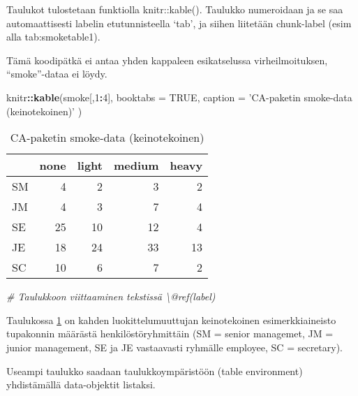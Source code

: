 \documentclass[finnish,]{book}
\newenvironment{Shaded}{\begin{snugshade}}{\end{snugshade}}
\newcommand{\CommentTok}[1]{\textcolor[rgb]{0.56,0.35,0.01}{\textit{#1}}}
\newcommand{\DataTypeTok}[1]{\textcolor[rgb]{0.13,0.29,0.53}{#1}}
\newcommand{\DecValTok}[1]{\textcolor[rgb]{0.00,0.00,0.81}{#1}}
\newcommand{\KeywordTok}[1]{\textcolor[rgb]{0.13,0.29,0.53}{\textbf{#1}}}
\newcommand{\NormalTok}[1]{#1}
\newcommand{\OperatorTok}[1]{\textcolor[rgb]{0.81,0.36,0.00}{\textbf{#1}}}
\newcommand{\OtherTok}[1]{\textcolor[rgb]{0.56,0.35,0.01}{#1}}
\newcommand{\StringTok}[1]{\textcolor[rgb]{0.31,0.60,0.02}{#1}}
\theoremstyle{definition}
\theoremstyle{definition}
\theoremstyle{definition}
\theoremstyle{remark}
\begin{document}
Taulukot tulostetaan funktiolla knitr::kable(). Taulukko numeroidaan ja
se saa automaattisesti labelin etutunnisteella `tab', ja siihen
liitetään chunk-label (esim alla tab:smoketable1).

Tämä koodipätkä ei antaa yhden kappaleen esikatselussa virheilmoituksen,
``smoke''-dataa ei löydy.

\begin{Shaded}
\begin{Highlighting}[]
\NormalTok{knitr}\OperatorTok{::}\KeywordTok{kable}\NormalTok{(smoke[,}\DecValTok{1}\OperatorTok{:}\DecValTok{4}\NormalTok{], }\DataTypeTok{booktabs =} \OtherTok{TRUE}\NormalTok{,}
  \DataTypeTok{caption =} \StringTok{'CA-paketin smoke-data (keinotekoinen)'}
\NormalTok{)}
\end{Highlighting}
\end{Shaded}

\begin{table}

\caption{\label{tab:smoketable1}CA-paketin smoke-data (keinotekoinen)}
\centering
\begin{tabular}[t]{lrrrr}
\toprule
  & none & light & medium & heavy\\
\midrule
SM & 4 & 2 & 3 & 2\\
JM & 4 & 3 & 7 & 4\\
SE & 25 & 10 & 12 & 4\\
JE & 18 & 24 & 33 & 13\\
SC & 10 & 6 & 7 & 2\\
\bottomrule
\end{tabular}
\end{table}

\begin{Shaded}
\begin{Highlighting}[]
\CommentTok{# Taulukkoon viittaaminen tekstissä \textbackslash{}@ref(label)}
\end{Highlighting}
\end{Shaded}

Taulukossa \ref{tab:smoketable1} on kahden luokittelumuuttujan
keinotekoinen esimerkkiaineisto tupakonnin määrästä henkilöstöryhmittäin
(SM = senior managemet, JM = junior management, SE ja JE vastaavasti
ryhmälle employee, SC = secretary).

Useampi taulukko saadaan taulukkoympäristöön (table environment)
yhdistämällä data-objektit listaksi.
\end{document}
